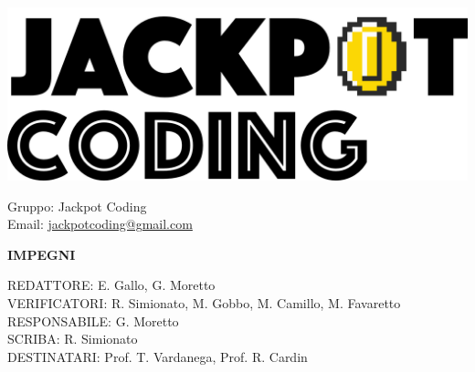 \documentclass[5pt]{article}
\begin{document}
\begin{minipage}[t]{0.50\textwidth}
    \begin{flushleft}
        \hspace{10pt}
        \includegraphics[scale=0.65]{assets/jackpot-logo.png} 
    \end{flushleft}
\end{minipage}
\hspace{-60pt} %
\begin{flushright}
    \begin{minipage}[t]{0.50\textwidth}
        \begin{flushright}
            Gruppo: {\Large Jackpot Coding}\\
            Email: \href{mailto:jackpotcoding@gmail.com}{jackpotcoding@gmail.com}
        \end{flushright}
    \end{minipage}
\end{flushright}

\vspace{24pt}

\begin{center}
    \textbf{\Huge IMPEGNI}
\end{center}

\vspace{13pt}

\begin{flushleft}
    \begin{spacing}{1.5}
        REDATTORE: E. Gallo, G. Moretto \\%
        VERIFICATORI: R. Simionato, M. Gobbo, M. Camillo, M. Favaretto \\
        RESPONSABILE: G. Moretto\\%
        \vspace{7pt}
        SCRIBA: R. Simionato\\%
        \vspace{7pt}
        DESTINATARI: Prof. T. Vardanega, Prof. R. Cardin\\%
    \end{spacing}
\end{flushleft}
\end{document}
